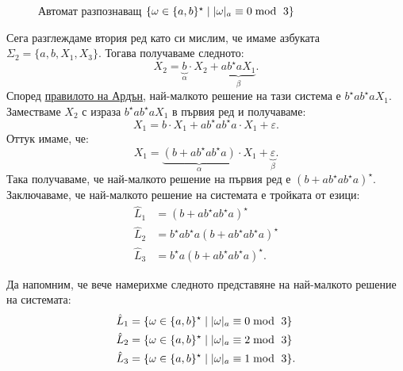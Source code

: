 \begin{example}
  \begin{figure}[H]
    \centering
    \caption{Автомат разпознаващ $\{\omega \in \{a,b\}^\star \mid \abs{\omega}_{a} \equiv 0 \bmod\ 3\}$}
  \end{figure}
  
  Сега разглеждаме втория ред като си мислим, че имаме азбуката $\Sigma_2 = \{a,b,X_1,X_3\}$. Тогава получаваме следното:
  \[X_2 = \underbrace{b}_{\alpha} \cdot X_2 + \underbrace{a b^\star a X_1}_{\beta}.\]
  Според \hyperref[prob:reg:arden]{правилото на Ардън}, най-малкото решение на тази система е $b^\star a b^\star a X_1$.
  Заместваме $X_2$ с израза $b^\star a b^\star a X_1$ в първия ред и получаваме:
  \[X_1 = b \cdot X_1 + ab^\star a b^\star a \cdot X_1  + \varepsilon.\]
  Оттук имаме, че:
  \[X_1 = \underbrace{(b + ab^\star a b^\star a)}_{\alpha} \cdot X_1 + \underbrace{\varepsilon}_{\beta}.\]
  Така получаваме, че най-малкото решение на първия ред е $(b + ab^\star a b^\star a)^\star$.
  Заключаваме, че най-малкото решение на системата е тройката от езици:
  \begin{align*}
    \hat{L}_1 & = (b + ab^\star a b^\star a)^\star\\
    \hat{L}_2 & = b^\star a b^\star a (b + ab^\star a b^\star a)^\star\\
    \hat{L}_3 & = b^\star a (b + ab^\star a b^\star a)^\star.
  \end{align*}
  
  Да напомним, че вече намерихме следното представяне на най-малкото решение на системата:
  \begin{align*}
    \hat{L}_1 & = \{\omega \in \{a,b\}^\star \mid \vert{\omega}\vert_{a} \equiv 0 \bmod\ 3\}\\
    \hat{L}_2 & = \{\omega \in \{a,b\}^\star \mid \vert{\omega}\vert_{a} \equiv 2 \bmod\ 3\}\\
    \hat{L}_3 & = \{\omega \in \{a,b\}^\star \mid \vert{\omega}\vert_{a} \equiv 1 \bmod\ 3\}.
  \end{align*}
\end{example}

